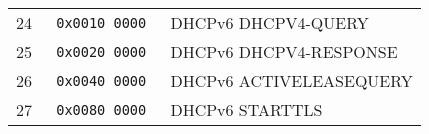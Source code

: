 \documentclass[documentation]{subfiles}
\begin{document}
\begin{longtable}{r>{\tt}rl}
    24 & 0x0010 0000 & DHCPv6 DHCPV4-QUERY\\
    25 & 0x0020 0000 & DHCPv6 DHCPV4-RESPONSE\\
    26 & 0x0040 0000 & DHCPv6 ACTIVELEASEQUERY\\
    27 & 0x0080 0000 & DHCPv6 STARTTLS\\
    \bottomrule
\end{longtable}
\end{document}
